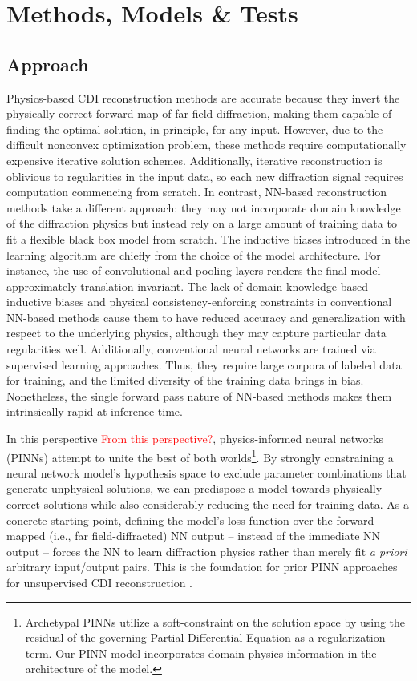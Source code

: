 \documentclass[sn-mathphys]{sn-jnl}%
\theoremstyle{thmstyleone}%
\theoremstyle{thmstyletwo}%
\theoremstyle{thmstylethree}%
\begin{document}
\section{Methods, Models \& Tests}
\subsection{Approach}

Physics-based CDI reconstruction methods are accurate because they invert the physically correct forward map of far field diffraction, making them capable of finding the optimal solution, in principle, for any input. However, due to the difficult nonconvex optimization problem, these methods require computationally expensive iterative solution schemes. Additionally, iterative reconstruction is oblivious to regularities in the input data, so each new diffraction signal requires computation commencing from scratch. In contrast, NN-based reconstruction methods take a different approach: they may not incorporate domain knowledge of the diffraction physics but instead rely on a large amount of training data to fit a flexible black box model from scratch. The inductive biases introduced in the learning algorithm are chiefly from the choice of the model architecture. For instance, the use of convolutional and pooling layers renders the final model approximately translation invariant. The lack of domain knowledge-based inductive biases and physical consistency-enforcing constraints in conventional NN-based methods cause them to have reduced accuracy and generalization with respect to the underlying physics, although they may capture particular data regularities well. Additionally, conventional neural networks are trained via supervised learning approaches. Thus, they require large corpora of labeled data for training, and the limited diversity of the training data brings in bias. Nonetheless, the single forward pass nature of NN-based methods makes them intrinsically rapid at inference time.

In this perspective \textcolor{red}{From this perspective?}, physics-informed neural networks (PINNs) attempt to unite the best of both worlds\footnote{Archetypal PINNs utilize a soft-constraint on the solution space by using the residual of the governing Partial Differential Equation as a regularization term. Our PINN model incorporates domain physics information in the architecture of the model.}. By strongly constraining a neural network model's hypothesis space to exclude parameter combinations that generate unphysical solutions, we can predispose a model towards physically correct solutions while also considerably reducing the need for training data. As a concrete starting point, defining the model's loss function over the forward-mapped (i.e., far field-diffracted) NN output -- instead of the immediate NN output -- forces the NN to learn diffraction physics rather than merely fit \emph{a priori} arbitrary input/output pairs. This is the foundation for prior PINN approaches for unsupervised CDI reconstruction \cite{yao2022autophasenn, ratner2021recovering}.
\end{document}
